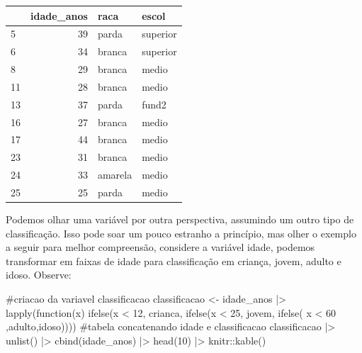 \documentclass[
  letterpaper,
  DIV=11,
  numbers=noendperiod]{scrreprt}
\newenvironment{Shaded}{\begin{snugshade}}{\end{snugshade}}
\newcommand{\CommentTok}[1]{\textcolor[rgb]{0.37,0.37,0.37}{#1}}
\newcommand{\ControlFlowTok}[1]{\textcolor[rgb]{0.00,0.23,0.31}{#1}}
\newcommand{\DecValTok}[1]{\textcolor[rgb]{0.68,0.00,0.00}{#1}}
\newcommand{\FunctionTok}[1]{\textcolor[rgb]{0.28,0.35,0.67}{#1}}
\newcommand{\NormalTok}[1]{\textcolor[rgb]{0.00,0.23,0.31}{#1}}
\newcommand{\OtherTok}[1]{\textcolor[rgb]{0.00,0.23,0.31}{#1}}
\newcommand{\SpecialCharTok}[1]{\textcolor[rgb]{0.37,0.37,0.37}{#1}}
\newcommand{\StringTok}[1]{\textcolor[rgb]{0.13,0.47,0.30}{#1}}
\begin{document}
\begin{longtable}[]{@{}lrll@{}}
\toprule()
& idade\_anos & raca & escol \\
\midrule()
\endhead
5 & 39 & parda & superior \\
6 & 34 & branca & superior \\
8 & 29 & branca & medio \\
11 & 28 & branca & medio \\
13 & 37 & parda & fund2 \\
16 & 27 & branca & medio \\
17 & 44 & branca & medio \\
23 & 31 & branca & medio \\
24 & 33 & amarela & medio \\
25 & 25 & parda & medio \\
\bottomrule()
\end{longtable}

Podemos olhar uma variável por outra perspectiva, assumindo um outro
tipo de classificação. Isso pode soar um pouco estranho a princípio, mas
olher o exemplo a seguir para melhor compreensão, considere a variável
idade, podemos transformar em faixas de idade para classificação em
criança, jovem, adulto e idoso. Observe:

\begin{Shaded}
\begin{Highlighting}[]
\CommentTok{\#criacao da variavel classificacao}
\NormalTok{classificacao }\OtherTok{\textless{}{-}}\NormalTok{ idade\_anos }\SpecialCharTok{|\textgreater{}}
  \FunctionTok{lapply}\NormalTok{(}\ControlFlowTok{function}\NormalTok{(x) }\FunctionTok{ifelse}\NormalTok{(x }\SpecialCharTok{\textless{}} \DecValTok{12}\NormalTok{, }\StringTok{\textquotesingle{}crianca\textquotesingle{}}\NormalTok{,}
                            \FunctionTok{ifelse}\NormalTok{(x }\SpecialCharTok{\textless{}} \DecValTok{25}\NormalTok{, }\StringTok{\textquotesingle{}jovem\textquotesingle{}}\NormalTok{,}
                                   \FunctionTok{ifelse}\NormalTok{( x }\SpecialCharTok{\textless{}} \DecValTok{60}\NormalTok{ ,}\StringTok{\textquotesingle{}adulto\textquotesingle{}}\NormalTok{,}\StringTok{\textquotesingle{}idoso\textquotesingle{}}\NormalTok{))))}
\CommentTok{\#tabela concatenando idade e classificacao}
\NormalTok{classificacao }\SpecialCharTok{|\textgreater{}} 
  \FunctionTok{unlist}\NormalTok{() }\SpecialCharTok{|\textgreater{}} 
  \FunctionTok{cbind}\NormalTok{(idade\_anos) }\SpecialCharTok{|\textgreater{}} 
  \FunctionTok{head}\NormalTok{(}\DecValTok{10}\NormalTok{) }\SpecialCharTok{|\textgreater{}}\NormalTok{ knitr}\SpecialCharTok{::}\FunctionTok{kable}\NormalTok{()}
\end{Highlighting}
\end{Shaded}
\end{document}

